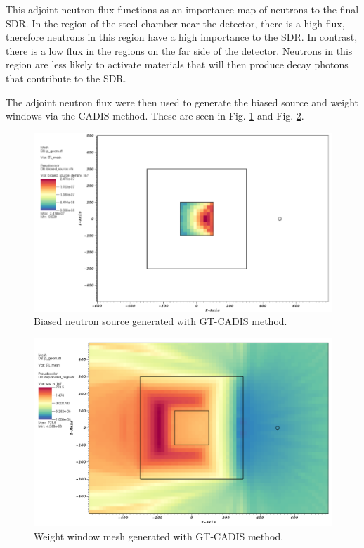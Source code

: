 This adjoint neutron flux functions as an importance map of neutrons to the
final SDR.  In the region of the steel chamber near the detector, there is a 
high flux, therefore neutrons in this region have a high importance to the SDR.
In contrast, there is a low flux in the regions on the
far side of the detector.  Neutrons in this region are less likely to activate
materials that will then produce decay photons that contribute to the
SDR.

The adjoint neutron flux were then used to generate the biased source and weight
windows via the CADIS method.  These are seen in Fig. \ref{fig:ex.biased_src} and
Fig. \ref{fig:ex.wwinp}.

\begin{figure} 
	\includegraphics[scale=0.45]{figs/biased_n_src.png}
	\caption [GT-CADIS biased neutron source] 
	{Biased neutron source generated with GT-CADIS method.\label{fig:ex.biased_src}}
\end{figure}

\begin{figure} 
	\includegraphics[scale=0.4]{figs/gtcadis_wwn.png}
	\caption [GT-CADIS weight window mesh]
	{Weight window mesh generated with GT-CADIS method.\label{fig:ex.wwinp}}
\end{figure}

